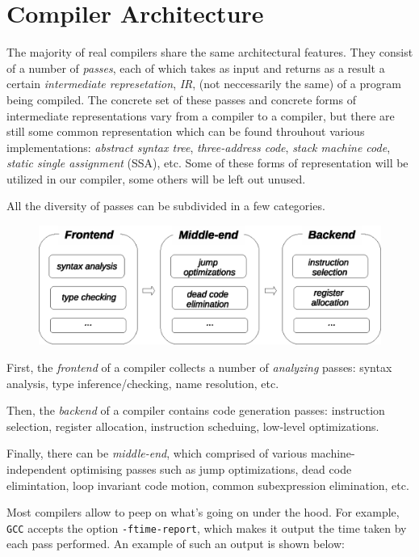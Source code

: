 \section{Compiler Architecture}

The majority of real compilers share the same architectural features. They consist of a number of \emph{passes}, each of which
takes as input and returns as a result a certain \emph{intermediate represetation}, \emph{IR}, (not neccessarily the same) of a program
being compiled. The concrete set of these passes and concrete forms of intermediate representations vary from a compiler to a compiler,
but there are still some common representation which can be found throuhout various implementations: \emph{abstract syntax tree},
\emph{three-address code}, \emph{stack machine code}, \emph{static single assignment} (SSA), etc. Some of these forms of representation
will be utilized in our compiler, some others will be left out unused.

All the diversity of passes can be subdivided in a few categories.

\begin{figure}[h]
  \centering
  \includegraphics[scale=0.7]{images/01-06.eps}
\end{figure}

First, the \emph{frontend} of a compiler collects a number of \emph{analyzing} passes: syntax analysis, type inference/checking,
name resolution, etc.

Then, the \emph{backend} of a compiler contains code generation passes: instruction selection, register allocation,
instruction scheduing, low-level optimizations.

Finally, there can be \emph{middle-end}, which comprised of various machine-independent optimising passes such as
jump optimizations, dead code elimintation, loop invariant code motion, common subexpression elimination, etc.

Most compilers allow to peep on what's going on under the hood. For example, \texttt{GCC} accepts the
option \texttt{-ftime-report}, which makes it output the time taken by each pass performed. An example
of such an output is shown below:

